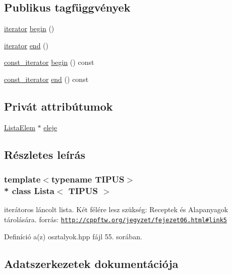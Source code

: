 \subsection*{Publikus tagfüggvények}
\begin{DoxyCompactItemize}
\item 
\hyperlink{classLista_classLista_1_1iterator}{iterator} \hyperlink{classLista_ac32b6933b5c76f89b7f5f8f44690a3d0}{begin} ()
\item 
\hyperlink{classLista_classLista_1_1iterator}{iterator} \hyperlink{classLista_ae8ce80dee0b50fbb37fe097af7a333df}{end} ()
\item 
\hyperlink{classLista_classLista_1_1const__iterator}{const\+\_\+iterator} \hyperlink{classLista_a5de2207b484332b1c359bb753c894cc1}{begin} () const 
\item 
\hyperlink{classLista_classLista_1_1const__iterator}{const\+\_\+iterator} \hyperlink{classLista_ac277630e720e2f2a7519cc018b497773}{end} () const 
\end{DoxyCompactItemize}
\subsection*{Privát attribútumok}
\begin{DoxyCompactItemize}
\item 
\hyperlink{classLista_structLista_1_1ListaElem}{Lista\+Elem} $\ast$ \hyperlink{classLista_a3bf1edb5c453b6c959ccab89792e81f4}{eleje}
\end{DoxyCompactItemize}


\subsection{Részletes leírás}
\subsubsection*{template$<$typename T\+I\+P\+US$>$\\*
class Lista$<$ T\+I\+P\+U\+S $>$}

iterátoros láncolt lista. Két félére lesz szükség\+: Receptek és Alapanyagok tárolására. forrás\+: \href{http://cppftw.org/jegyzet/fejezet06.html#link5}{\tt http\+://cppftw.\+org/jegyzet/fejezet06.\+html\#link5} 

Definíció a(z) osztalyok.\+hpp fájl 55. sorában.



\subsection{Adatszerkezetek dokumentációja}
\label{classLista_1_1const__iterator}
\hypertarget{classLista_classLista_1_1const__iterator}{}
